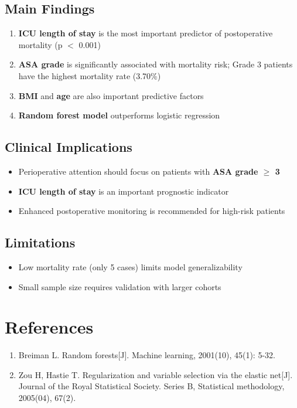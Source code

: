 \documentclass[12pt,a4paper]{article}
\begin{document}
\subsection{Main Findings}
\begin{enumerate}
    \item \textbf{ICU length of stay} is the most important predictor of postoperative mortality (p $<$ 0.001)
    \item \textbf{ASA grade} is significantly associated with mortality risk; Grade 3 patients have the highest mortality rate (3.70\%)
    \item \textbf{BMI} and \textbf{age} are also important predictive factors
    \item \textbf{Random forest model} outperforms logistic regression
\end{enumerate}

\subsection{Clinical Implications}
\begin{itemize}
    \item Perioperative attention should focus on patients with \textbf{ASA grade $\geq$ 3}
    \item \textbf{ICU length of stay} is an important prognostic indicator
    \item Enhanced postoperative monitoring is recommended for high-risk patients
\end{itemize}

\subsection{Limitations}
\begin{itemize}
    \item Low mortality rate (only 5 cases) limits model generalizability
    \item Small sample size requires validation with larger cohorts
\end{itemize}

\section*{References}
\begin{enumerate}
    \item Breiman L. Random forests[J]. Machine learning, 2001(10), 45(1): 5-32.
    \item Zou H, Hastie T. Regularization and variable selection via the elastic net[J]. Journal of the Royal Statistical Society. Series B, Statistical methodology, 2005(04), 67(2).
\end{enumerate}
\end{document}
